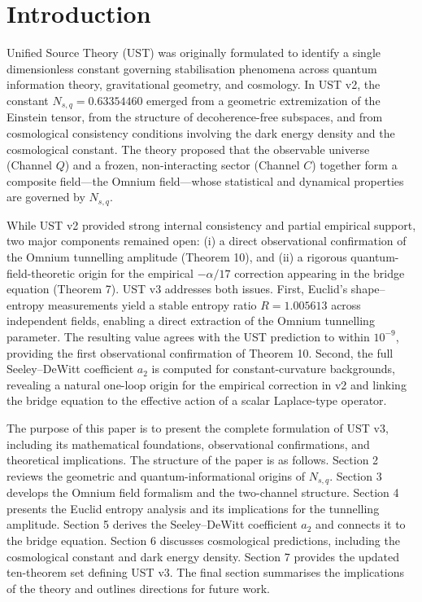 \documentclass[12pt]{article}
\begin{document}

\section{Introduction}

Unified Source Theory (UST) was originally formulated to identify a single
dimensionless constant governing stabilisation phenomena across quantum
information theory, gravitational geometry, and cosmology. In UST v2, the
constant $N_{s,q} = 0.63354460$ emerged from a geometric extremization of the
Einstein tensor, from the structure of decoherence-free subspaces, and from
cosmological consistency conditions involving the dark energy density and the
cosmological constant. The theory proposed that the observable universe
(Channel $Q$) and a frozen, non-interacting sector (Channel $C$) together form
a composite field---the Omnium field---whose statistical and dynamical
properties are governed by $N_{s,q}$.

While UST v2 provided strong internal consistency and partial empirical
support, two major components remained open: (i) a direct observational
confirmation of the Omnium tunnelling amplitude (Theorem 10), and (ii) a
rigorous quantum-field-theoretic origin for the empirical $-\alpha/17$
correction appearing in the bridge equation (Theorem 7). UST v3 addresses both
issues. First, Euclid’s shape--entropy measurements yield a stable entropy
ratio $R = 1.005613$ across independent fields, enabling a direct extraction of
the Omnium tunnelling parameter. The resulting value agrees with the UST
prediction to within $10^{-9}$, providing the first observational confirmation
of Theorem 10. Second, the full Seeley--DeWitt coefficient $a_{2}$ is computed
for constant-curvature backgrounds, revealing a natural one-loop origin for
the empirical correction in v2 and linking the bridge equation to the
effective action of a scalar Laplace-type operator.

The purpose of this paper is to present the complete formulation of UST v3,
including its mathematical foundations, observational confirmations, and
theoretical implications. The structure of the paper is as follows. Section 2
reviews the geometric and quantum-informational origins of $N_{s,q}$. Section
3 develops the Omnium field formalism and the two-channel structure. Section 4
presents the Euclid entropy analysis and its implications for the tunnelling
amplitude. Section 5 derives the Seeley--DeWitt coefficient $a_{2}$ and
connects it to the bridge equation. Section 6 discusses cosmological
predictions, including the cosmological constant and dark energy density.
Section 7 provides the updated ten-theorem set defining UST v3. The final
section summarises the implications of the theory and outlines directions for
future work.
\end{document}
